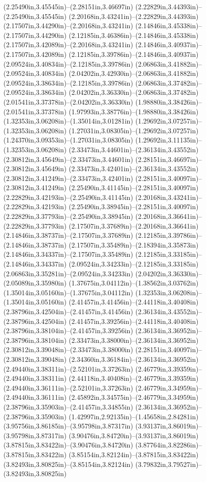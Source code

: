 (2.25490in,3.45545in)--(2.28151in,3.46697in) (2.22829in,3.44393in)--(2.25490in,3.45545in) (2.20168in,3.43241in)--(2.22829in,3.44393in) (2.17507in,3.44290in)--(2.20168in,3.43241in) (2.14846in,3.45338in)--(2.17507in,3.44290in) (2.12185in,3.46386in)--(2.14846in,3.45338in) (2.17507in,3.42089in)--(2.20168in,3.43241in) (2.14846in,3.40937in)--(2.17507in,3.42089in) (2.12185in,3.39786in)--(2.14846in,3.40937in) (2.09524in,3.40834in)--(2.12185in,3.39786in) (2.06863in,3.41882in)--(2.09524in,3.40834in) (2.04202in,3.42930in)--(2.06863in,3.41882in) (2.09524in,3.38634in)--(2.12185in,3.39786in) (2.06863in,3.37482in)--(2.09524in,3.38634in) (2.04202in,3.36330in)--(2.06863in,3.37482in) (2.01541in,3.37378in)--(2.04202in,3.36330in) (1.98880in,3.38426in)--(2.01541in,3.37378in) (1.97993in,3.38776in)--(1.98880in,3.38426in) (1.32353in,3.06208in)--(1.35014in,3.01281in) (1.29692in,3.07257in)--(1.32353in,3.06208in) (1.27031in,3.08305in)--(1.29692in,3.07257in) (1.24370in,3.09353in)--(1.27031in,3.08305in) (1.29692in,3.11135in)--(1.32353in,3.06208in) (2.33473in,3.44601in)--(2.36134in,3.43552in) (2.30812in,3.45649in)--(2.33473in,3.44601in) (2.28151in,3.46697in)--(2.30812in,3.45649in) (2.33473in,3.42401in)--(2.36134in,3.43552in) (2.30812in,3.41249in)--(2.33473in,3.42401in) (2.28151in,3.40097in)--(2.30812in,3.41249in) (2.25490in,3.41145in)--(2.28151in,3.40097in) (2.22829in,3.42193in)--(2.25490in,3.41145in) (2.20168in,3.43241in)--(2.22829in,3.42193in) (2.25490in,3.38945in)--(2.28151in,3.40097in) (2.22829in,3.37793in)--(2.25490in,3.38945in) (2.20168in,3.36641in)--(2.22829in,3.37793in) (2.17507in,3.37689in)--(2.20168in,3.36641in) (2.14846in,3.38737in)--(2.17507in,3.37689in) (2.12185in,3.39786in)--(2.14846in,3.38737in) (2.17507in,3.35489in)--(2.18394in,3.35873in) (2.14846in,3.34337in)--(2.17507in,3.35489in) (2.12185in,3.33185in)--(2.14846in,3.34337in) (2.09524in,3.34233in)--(2.12185in,3.33185in) (2.06863in,3.35281in)--(2.09524in,3.34233in) (2.04202in,3.36330in)--(2.05089in,3.35980in) (1.37675in,3.04112in)--(1.38562in,3.03762in) (1.35014in,3.05160in)--(1.37675in,3.04112in) (1.32353in,3.06208in)--(1.35014in,3.05160in) (2.41457in,3.41456in)--(2.44118in,3.40408in) (2.38796in,3.42504in)--(2.41457in,3.41456in) (2.36134in,3.43552in)--(2.38796in,3.42504in) (2.41457in,3.39256in)--(2.44118in,3.40408in) (2.38796in,3.38104in)--(2.41457in,3.39256in) (2.36134in,3.36952in)--(2.38796in,3.38104in) (2.33473in,3.38000in)--(2.36134in,3.36952in) (2.30812in,3.39048in)--(2.33473in,3.38000in) (2.28151in,3.40097in)--(2.30812in,3.39048in) (2.34360in,3.36184in)--(2.36134in,3.36952in) (2.49440in,3.38311in)--(2.52101in,3.37263in) (2.46779in,3.39359in)--(2.49440in,3.38311in) (2.44118in,3.40408in)--(2.46779in,3.39359in) (2.49440in,3.36111in)--(2.52101in,3.37263in) (2.46779in,3.34959in)--(2.49440in,3.36111in) (2.45892in,3.34575in)--(2.46779in,3.34959in) (2.38796in,3.35903in)--(2.41457in,3.34855in) (2.36134in,3.36952in)--(2.38796in,3.35903in) (1.42997in,2.92135in)--(1.45658in,2.84281in) (3.95756in,3.86185in)--(3.95798in,3.87317in) (3.93137in,3.86019in)--(3.95798in,3.87317in) (3.90476in,3.84720in)--(3.93137in,3.86019in) (3.87815in,3.83422in)--(3.90476in,3.84720in) (3.87764in,3.82286in)--(3.87815in,3.83422in) (3.85154in,3.82124in)--(3.87815in,3.83422in) (3.82493in,3.80825in)--(3.85154in,3.82124in) (3.79832in,3.79527in)--(3.82493in,3.80825in) 